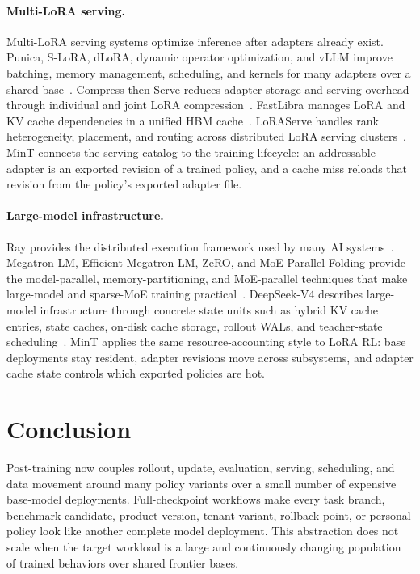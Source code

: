 \documentclass{llmxive}
\begin{document}
\paragraph{Multi-LoRA serving.}
Multi-LoRA serving systems optimize inference after adapters already exist. Punica, S-LoRA, dLoRA, dynamic operator optimization, and vLLM improve batching, memory management, scheduling, and kernels for many adapters over a shared base~\citep{punica2024,slora2023,dlora2024,zhou2025dynamic,vllm2023}. Compress then Serve reduces adapter storage and serving overhead through individual and joint LoRA compression~\citep{compress_then_serve2024}. FastLibra manages LoRA and KV cache dependencies in a unified HBM cache~\citep{fastlibra2025}. LoRAServe handles rank heterogeneity, placement, and routing across distributed LoRA serving clusters~\citep{loraserve2025}. MinT connects the serving catalog to the training lifecycle: an addressable adapter is an exported revision of a trained policy, and a cache miss reloads that revision from the policy's exported adapter file.

\paragraph{Large-model infrastructure.}
Ray provides the distributed execution framework used by many AI systems~\citep{ray2018}. Megatron-LM, Efficient Megatron-LM, ZeRO, and MoE Parallel Folding provide the model-parallel, memory-partitioning, and MoE-parallel techniques that make large-model and sparse-MoE training practical~\citep{megatronlm2019,efficient_megatronlm2021,zero2019,moe_parallel_folding2026}. DeepSeek-V4 describes large-model infrastructure through concrete state units such as hybrid KV cache entries, state caches, on-disk cache storage, rollout WALs, and teacher-state scheduling~\citep{deepseekv4_2026}. MinT applies the same resource-accounting style to LoRA RL: base deployments stay resident, adapter revisions move across subsystems, and adapter cache state controls which exported policies are hot.

\section{Conclusion}

Post-training now couples rollout, update, evaluation, serving, scheduling, and data movement around many policy variants over a small number of expensive base-model deployments. Full-checkpoint workflows make every task branch, benchmark candidate, product version, tenant variant, rollback point, or personal policy look like another complete model deployment. This abstraction does not scale when the target workload is a large and continuously changing population of trained behaviors over shared frontier bases.
\end{document}
